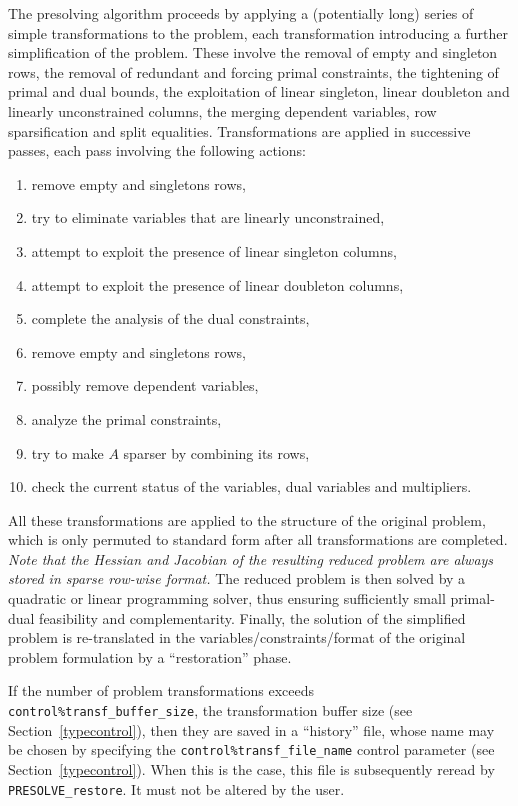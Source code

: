\documentclass{galahad}
\newcommand{\packagename}{PRESOLVE}
\begin{document}
The presolving algorithm proceeds by applying a (potentially long) series of
simple transformations to the problem, each transformation introducing a
further simplification of the problem. These involve the removal of empty and
singleton rows, the removal of redundant and forcing primal constraints, the
tightening of primal and dual bounds, the exploitation of linear singleton,
linear doubleton and linearly unconstrained columns, the merging dependent
variables, row sparsification and split equalities. Transformations are
applied in successive passes, each pass involving the following actions:
\begin{enumerate}
\item remove empty and singletons rows,
\item try to eliminate variables that are linearly unconstrained,
\item attempt to exploit the presence of linear singleton columns,
\item attempt to exploit the presence of linear doubleton columns,
\item complete the analysis of the dual constraints,
\item remove empty and singletons rows,
\item possibly remove dependent variables,
\item analyze the primal constraints,
\item try to make $A$ sparser by combining its rows,
\item check the current status of the variables, dual variables
      and multipliers.
\end{enumerate}
All these transformations are applied to the structure of the original
problem, which is only permuted to standard form after all transformations are
completed. \emph{Note that the Hessian and Jacobian of the resulting reduced
problem are always stored in sparse row-wise format.} The reduced problem is
then solved by a quadratic or linear programming solver, thus ensuring
sufficiently small primal-dual feasibility and complementarity. Finally, the
solution of the simplified problem is re-translated in the
variables/constraints/format of the original problem formulation by a
``restoration'' phase.

If the number of problem transformations exceeds {\tt
control\%transf\_buffer\_size},  the transformation buffer size (see
Section~\ref{typecontrol}), then they are saved in a ``history'' file, whose
name may be chosen by specifying the {\tt control\%transf\_file\_name} control
parameter (see Section~\ref{typecontrol}).  When this is the case, this file
is subsequently reread by {\tt \packagename\_restore}. It must not be altered
by the user.
\end{document}
